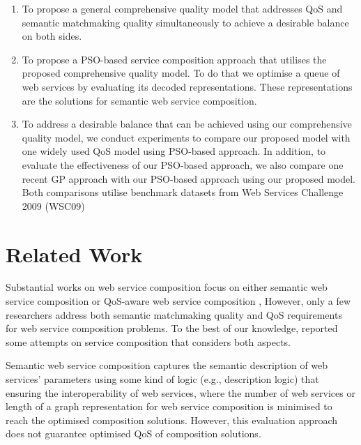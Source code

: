 \documentclass{llncs}
\begin{document}
\begin{enumerate}
 \item To propose a general comprehensive quality model that addresses QoS and semantic matchmaking quality simultaneously to achieve a desirable balance on both sides.
  
 \item To propose a PSO-based service composition approach that utilises the proposed comprehensive quality model. To do that we optimise a queue of web services by evaluating its decoded representations. These representations are the solutions for semantic web service composition.
  
 \item To address a desirable balance that can be achieved using our comprehensive quality model, we conduct experiments to compare our proposed model with one widely used QoS model using PSO-based approach. In addition, to evaluate the effectiveness of our PSO-based approach,  we also compare one recent GP approach \cite{ma2015hybrid} with our PSO-based approach using our proposed model. Both comparisons utilise benchmark datasets from Web Services Challenge 2009 (WSC09) \cite{kona2009wsc} 
  
\end{enumerate}

\section{Related Work} \label{relatedWork}
Substantial works on web service composition focus on either semantic web service composition \cite{boustil2014semantic,bansal2016generalized,mier2015integrated} or QoS-aware web service composition \cite{gupta2015optimization,qi2010combining,ma2015hybrid,da2016particle,da2015graphevol,yu2013adaptive}, However, only a few researchers address both semantic matchmaking quality and QoS requirements for web service composition problems. To the best of our knowledge, \cite{fanjiang2014semantic,lecue2009optimizing,pop2009immune} reported some attempts on service composition that considers both aspects.

Semantic web service composition \cite{boustil2014semantic,bansal2016generalized,mier2015integrated} captures the semantic description of web services' parameters using some kind of logic (e.g., description logic) that ensuring the interoperability of web services, where the number of web services or length of a graph representation for web service composition is minimised to reach the optimised composition solutions. However, this evaluation approach does not guarantee optimised QoS of composition solutions.
\end{document}
